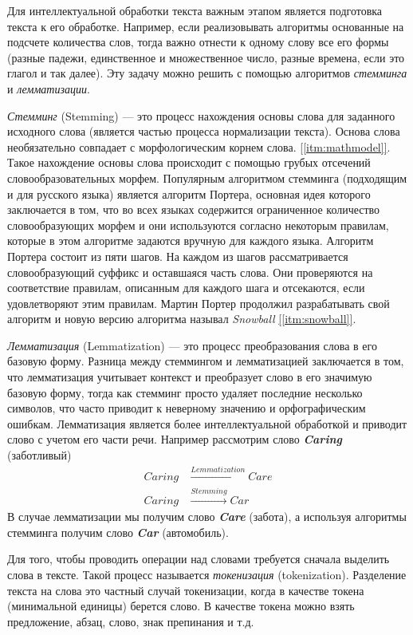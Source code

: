 Для интеллектуальной обработки текста важным этапом является подготовка текста к его обработке. Например, если реализовывать алгоритмы основанные на подсчете количества слов, тогда важно отнести к одному слову все его формы (разные падежи, единственное и множественное число, разные времена, если это глагол и так далее). Эту задачу можно решить с помощью алгоритмов \textit{стемминга} и \textit{лемматизации}.

\textit{Стемминг} (Stemming) --- это процесс нахождения основы слова для заданного исходного слова (является частью процесса нормализации текста).
Основа слова необязательно совпадает с морфологическим корнем слова. \hyperref[itm:mathmodel]{[\ref{itm:mathmodel}]}. Такое нахождение основы слова происходит с помощью грубых отсечений словообразовательных морфем. Популярным алгоритмом стемминга (подходящим и для русского языка) является алгоритм Портера, основная идея которого заключается в том, что во всех языках содержится ограниченное количество словообразующих морфем и они используются согласно некоторым правилам, которые в этом алгоритме задаются вручную для каждого языка. Алгоритм Портера состоит из пяти шагов. На каждом из шагов рассматривается словообразующий суффикс и оставшаяся часть слова. Они проверяются на соответствие правилам, описанным для каждого шага и отсекаются, если удовлетворяют этим правилам. Мартин Портер продолжил разрабатывать свой алгоритм и новую версию алгоритма называл \textit{Snowball} \hyperref[itm:snowball]{[\ref{itm:snowball}]}.


\textit{Лемматизация} (Lemmatization) --- это процесс преобразования слова в его базовую форму. Разница между стеммингом и лемматизацией заключается в том, что лемматизация учитывает контекст и преобразует слово в его значимую базовую форму, тогда как стемминг просто удаляет последние несколько символов, что часто приводит к неверному значению и орфографическим ошибкам. Лемматизация является более интеллектуальной обработкой и приводит слово с учетом его части речи. Например рассмотрим слово \textbf{\textit{Caring}} (заботливый)
\begin{align*}
Caring &\xrightarrow{Lemmatization} Care \\
Caring &\xrightarrow{Stemming} Car
\end{align*} 
В случае лемматизации мы получим слово \textbf{\textit{Care}} (забота), а используя алгоритмы стемминга получим слово \textbf{\textit{Car}} (автомобиль).

Для того, чтобы проводить операции над словами требуется сначала выделить слова в тексте. Такой процесс называется \textit{токенизация} (tokenization). Разделение текста на слова это частный случай токенизации, когда в качестве токена (минимальной единицы) берется слово. В качестве токена можно взять предложение, абзац, слово, знак препинания и т.д. 

